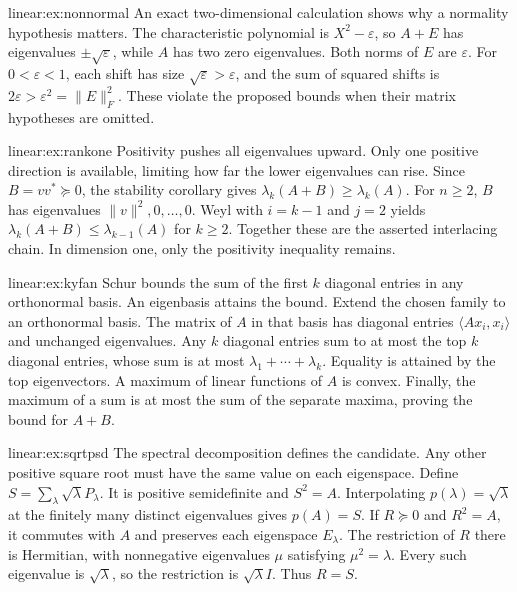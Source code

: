 \begin{solution}{linear:ex:nonnormal}
\idea An exact two-dimensional calculation shows why a normality hypothesis matters.
\writeup The characteristic polynomial is $X^2-\varepsilon$, so $A+E$ has eigenvalues $\pm\sqrt\varepsilon$, while $A$ has two zero eigenvalues. Both norms of $E$ are $\varepsilon$. For $0<\varepsilon<1$, each shift has size $\sqrt\varepsilon>\varepsilon$, and the sum of squared shifts is $2\varepsilon>\varepsilon^2=\|E\|_F^2$. These violate the proposed bounds when their matrix hypotheses are omitted.
\end{solution}
\begin{solution}{linear:ex:rankone}
\idea Positivity pushes all eigenvalues upward. Only one positive direction is available, limiting how far the lower eigenvalues can rise.
\writeup Since $B=vv^*\succeq0$, the stability corollary gives $\lambda_k(A+B)\ge\lambda_k(A)$. For $n\ge2$, $B$ has eigenvalues $\|v\|^2,0,\dots,0$. Weyl with $i=k-1$ and $j=2$ yields $\lambda_k(A+B)\le\lambda_{k-1}(A)$ for $k\ge2$. Together these are the asserted interlacing chain. In dimension one, only the positivity inequality remains.
\end{solution}
\begin{solution}{linear:ex:kyfan}
\idea Schur bounds the sum of the first $k$ diagonal entries in any orthonormal basis. An eigenbasis attains the bound.
\writeup Extend the chosen family to an orthonormal basis. The matrix of $A$ in that basis has diagonal entries $\langle Ax_i,x_i\rangle$ and unchanged eigenvalues. Any $k$ diagonal entries sum to at most the top $k$ diagonal entries, whose sum is at most $\lambda_1+\cdots+\lambda_k$. Equality is attained by the top eigenvectors. A maximum of linear functions of $A$ is convex. Finally, the maximum of a sum is at most the sum of the separate maxima, proving the bound for $A+B$.
\end{solution}
\begin{solution}{linear:ex:sqrtpsd}
\idea The spectral decomposition defines the candidate. Any other positive square root must have the same value on each eigenspace.
\writeup Define $S=\sum_\lambda\sqrt\lambda P_\lambda$. It is positive semidefinite and $S^2=A$. Interpolating $p(\lambda)=\sqrt\lambda$ at the finitely many distinct eigenvalues gives $p(A)=S$. If $R\succeq0$ and $R^2=A$, it commutes with $A$ and preserves each eigenspace $E_\lambda$. The restriction of $R$ there is Hermitian, with nonnegative eigenvalues $\mu$ satisfying $\mu^2=\lambda$. Every such eigenvalue is $\sqrt\lambda$, so the restriction is $\sqrt\lambda I$. Thus $R=S$.
\end{solution}
